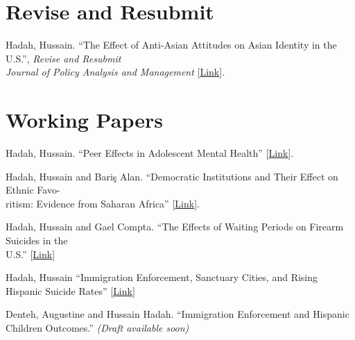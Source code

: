 \documentclass[letterpaper]{article}
\renewenvironment{itemize}{
  \begin{list}{}{
    \setlength{\leftmargin}{1.5em}
  }
}{
  \end{list}
}
\begin{document}
\section*{Revise and Resubmit}
\vspace{2 mm}
\begin{itemize}
  \item Hadah, Hussain. ``The Effect of Anti-Asian Attitudes on Asian Identity in the U.S.'', \textit{Revise and Resubmit} \\{\makebox[4mm]{\hfill}} \textit{Journal of Policy Analysis and Management} [\href{https://hhadah.github.io/asian-identity-attrition/my_paper/submit_preprint.pdf}{Link}]. 
\end{itemize}
\vspace{2 mm}
\section*{Working Papers}
\vspace{2 mm}
\begin{itemize}
  \item Hadah, Hussain. ``Peer Effects in Adolescent Mental Health'' [\href{https://hhadah.github.io/Depression_Idea/my_paper/Hadah-Peer-Effect-Depression.pdf}{Link}].
  \item Hadah, Hussain and Bariş Alan\student. ``Democratic Institutions and Their Effect on Ethnic Favo-\\{\makebox[4mm]{\hfill}} ritism: Evidence from Saharan Africa'' [\href{https://dx.doi.org/10.2139/ssrn.4566225}{Link}].
  \item Hadah, Hussain and Gael Compta\student. ``The Effects of Waiting Periods on Firearm Suicides in the \\{\makebox[4mm]{\hfill}} U.S.'' [\href{https://dx.doi.org/10.2139/ssrn.5383500}{Link}]
  \item Hadah, Hussain ``Immigration Enforcement, Sanctuary Cities, and Rising Hispanic Suicide Rates'' [\href{https://hhadah.github.io/sc-and-hispanic-children-suicide/my_paper/sc_and_hispanic_children_suicide.pdf}{Link}]
  \item Denteh, Augustine and Hussain Hadah. ``Immigration Enforcement and Hispanic Children Outcomes.'' \textit{(Draft available soon)}
\studentnote
\end{itemize}
\vspace{2 mm}
\end{document}
